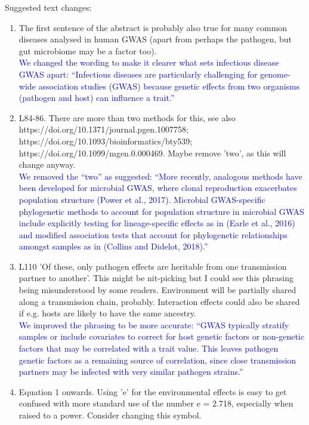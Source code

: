 \documentclass[11pt]{article}
\begin{document}
\vspace{5mm}
Suggested text changes:

\begin{enumerate}
    \item The first sentence of the abstract is probably also true for many common diseases analysed in human GWAS (apart from perhaps the pathogen, but gut microbiome may be a factor too). \\
    \textcolor{blue}{We changed the wording to make it clearer what sets infectious disease GWAS apart: ``Infectious diseases are particularly challenging for genome-wide association studies (GWAS) because genetic effects from two organisms (pathogen and host) can influence a trait.''}
    \item L84-86. There are more than two methods for this, see also https://doi.org/10.1371/journal.pgen.1007758; https://doi.org/10.1093/bioinformatics/bty539; https://doi.org/10.1099/mgen.0.000469. Maybe remove 'two', as this will change anyway.\\
    \textcolor{blue}{We removed the ``two'' as suggested: ``More recently, analogous methods have been developed for microbial GWAS, where clonal reproduction exacerbates population structure (Power et al., 2017). Microbial GWAS-specific phylogenetic methods to account for population structure in microbial GWAS include explicitly testing for lineage-specific effects as in (Earle et al., 2016) and modified association tests that account for phylogenetic relationships amongst samples as in (Collins and Didelot, 2018).''}
    \item L110 'Of these, only pathogen effects are heritable from one transmission partner to another'. This might be nit-picking but I could see this phrasing being misunderstood by some readers. Environment will be partially shared along a transmission chain, probably. Interaction effects could also be shared if e.g. hosts are likely to have the same ancestry.\\
    \textcolor{blue}{We improved the phrasing to be more accurate: ``GWAS typically stratify samples or include covariates to correct for host genetic factors or non-genetic factors that may be correlated with a trait value. This leaves pathogen genetic factors as a remaining source of correlation, since close transmission partners may be infected with very similar pathogen strains.''}
    \item Equation 1 onwards. Using 'e' for the environmental effects is easy to get confused with more standard use of the number e = 2.718, especially when raised to a power. Consider changing this symbol.\\

\end{enumerate}
\end{document}
